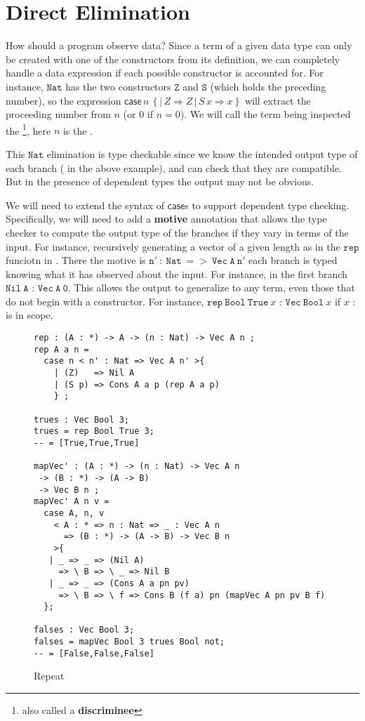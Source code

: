 \section{Direct Elimination}

How should a program observe data?
Since a term of a given data type can only be created with one of the constructors from its definition, we can completely handle a data expression if each possible constructor is accounted for.
For instance, $\mathtt{Nat}$ has the two constructors $\mathtt{Z}$ and $\mathtt{S}$ (which holds the preceding number), so the expression $\mathsf{case}\,n\,\left\{ |\,Z\Rightarrow Z\,|\,S\,x\Rightarrow x\right\}$ will extract the proceeding number from $n$ (or $0$ if $n=0$).
We will call the term being inspected the \textbf{\scrut{}}\footnote{also called a \textbf{discriminee}}, here $n$ is the \scrut{}.
 
This $\mathtt{Nat}$ elimination is type checkable since we know the intended output type of each branch (\Nat{} in the above example), and can check that they are compatible.
But in the presence of dependent types the output may not be obvious.

We will need to extend the syntax of $\mathsf{case}$s to support dependent type checking.
Specifically, we will need to add a \textbf{motive} annotation that allows the type checker to compute the output type of the branches if they vary in terms of the input.
For instance, recursively generating a vector of a given length as in the $\mathtt{rep}$ funciotn in .
There the motive is $\mathtt{n'\ :\ Nat\ =>\ Vec\ A\ n'}$ each branch is typed knowing what it has observed about the input.
For instance, in the first branch $\mathtt{Nil\ A}$ :  $\mathtt{Vec\ A\ 0}$.
This allows the output to generalize to any term, even those that do not begin with a constructor.
For instance, $\mathtt{rep\ Bool\ True\ }x$ : $\mathtt{Vec\ Bool\ }x$ if $x$ : \Nat{} is in scope.

\begin{figure}
\begin{lstlisting}[basicstyle={\ttfamily\small}]
rep : (A : *) -> A -> (n : Nat) -> Vec A n ;
rep A a n = 
  case n < n' : Nat => Vec A n' >{
    | (Z)   => Nil A
    | (S p) => Cons A a p (rep A a p)
    } ;

trues : Vec Bool 3;
trues = rep Bool True 3;
-- = [True,True,True]

mapVec' : (A : *) -> (n : Nat) -> Vec A n 
 -> (B : *) -> (A -> B)
 -> Vec B n ;
mapVec' A n v =
  case A, n, v 
    < A : * => n : Nat => _ : Vec A n 
      => (B : *) -> (A -> B) -> Vec B n 
    >{
   | _ => _ => (Nil A)          
     => \ B => \ _ => Nil B
   | _ => _ => (Cons A a pn pv) 
     => \ B => \ f => Cons B (f a) pn (mapVec A pn pv B f)
  };

falses : Vec Bool 3;
falses = mapVec Bool 3 trues Bool not;
-- = [False,False,False]
\end{lstlisting}
\caption{Repeat}
\label{fig:data-elim-examples}
\end{figure}

